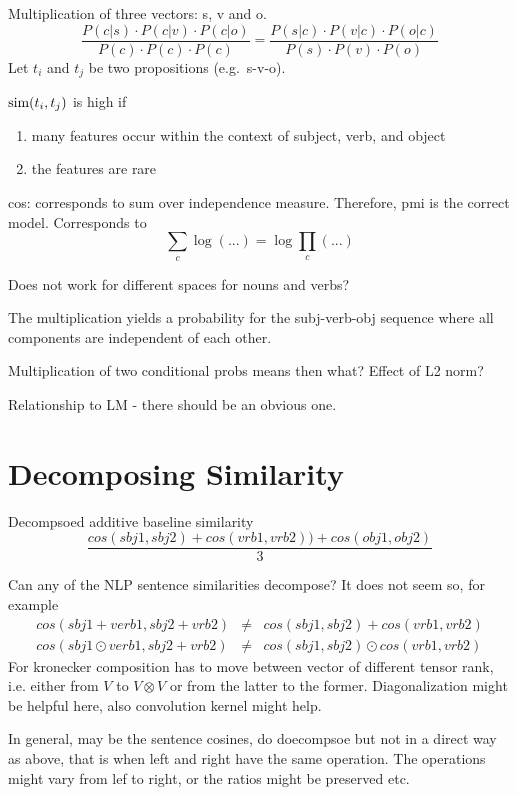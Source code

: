 Multiplication of three vectors: s, v and o.
\[
\frac{
P(c|s) \cdot P(c|v) \cdot P(c|o)}{
P(c) \cdot P(c) \cdot P(c)} =
\frac{
P(s|c) \cdot P(v|c) \cdot P(o|c)
}{
P(s) \cdot P(v) \cdot P(o)
}
\]
Let $t_i$ and $t_j$ be two propositions
(e.g.~s-v-o).

$\textmd{sim}(t_i,t_j)$ is high if
\begin{enumerate}
\item many features occur within the context of subject, verb, and object
\item the features are rare
\end{enumerate}

cos: corresponds to sum over independence measure.
Therefore, pmi is the correct model.
Corresponds to
\[
\sum_c \log(...) = \log \prod_c(...)
\]



Does not work for different
spaces for nouns and verbs?

The multiplication yields a probability
for the subj-verb-obj sequence where all
components are independent of each other.

Multiplication of two conditional probs means then what?
Effect of L2 norm?


Relationship to LM - there should be an obvious one.


\section{Decomposing Similarity}
Decompsoed additive baseline similarity
\[
\frac{cos(sbj1,sbj2) + cos(vrb1,vrb2)) + cos(obj1,obj2)}{3}
\]

Can any of the NLP sentence similarities decompose? It does not seem so, for example
\begin{eqnarray*}
cos(sbj1+verb1,sbj2+vrb2) &\neq& cos(sbj1, sbj2) + cos(vrb1,vrb2) \\
cos(sbj1\odot verb1,sbj2+vrb2) &\neq& cos(sbj1, sbj2) \odot cos(vrb1,vrb2)
\end{eqnarray*}
For kronecker composition has to move between vector of different tensor rank, i.e. either from $V$ to $V \otimes V$ or from the latter to the former. Diagonalization might be helpful here, also convolution kernel might help. 

In general, may be the sentence cosines, do doecompsoe but not in a direct way as above, that is when left and right have the same operation. The operations might vary from lef to right, or the ratios might be preserved etc. 



